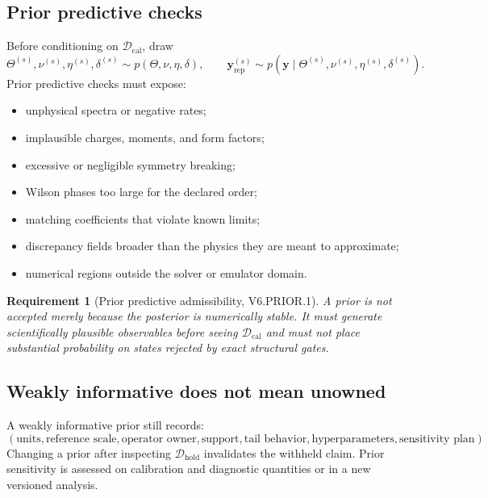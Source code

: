 \documentclass[11pt]{article}
\newtheorem{requirement}[definition]{Requirement}
\newcommand{\caldata}{\mathcal D_{\mathrm{cal}}}
\newcommand{\holddata}{\mathcal D_{\mathrm{hold}}}
\newcommand{\repdata}{\mathrm{rep}}
\begin{document}
\subsection{Prior predictive checks}

Before conditioning on \(\caldata\), draw
\begin{equation}
 \Theta^{(s)},\nu^{(s)},\eta^{(s)},\delta^{(s)}
 \sim p(\Theta,\nu,\eta,\delta),
 \qquad
 \bm y_{\repdata}^{(s)}
 \sim p(\bm y\mid\Theta^{(s)},\nu^{(s)},\eta^{(s)},\delta^{(s)}).
 \label{eq:prior-predictive}
\end{equation}
Prior predictive checks must expose:
\begin{itemize}
\item unphysical spectra or negative rates;
\item implausible charges, moments, and form factors;
\item excessive or negligible symmetry breaking;
\item Wilson phases too large for the declared order;
\item matching coefficients that violate known limits;
\item discrepancy fields broader than the physics they are meant to
      approximate;
\item numerical regions outside the solver or emulator domain.
\end{itemize}

\begin{requirement}[Prior predictive admissibility, V6.PRIOR.1]
A prior is not accepted merely because the posterior is numerically stable.
It must generate scientifically plausible observables before seeing
\(\caldata\) and must not place substantial probability on states rejected by
exact structural gates.
\end{requirement}

\subsection{Weakly informative does not mean unowned}

A weakly informative prior still records:
\begin{equation}
 \left(
 \text{units},
 \text{reference scale},
 \text{operator owner},
 \text{support},
 \text{tail behavior},
 \text{hyperparameters},
 \text{sensitivity plan}
 \right).
 \label{eq:prior-record}
\end{equation}
Changing a prior after inspecting \(\holddata\) invalidates the withheld claim.
Prior sensitivity is assessed on calibration and diagnostic quantities or in
a new versioned analysis.
\end{document}
